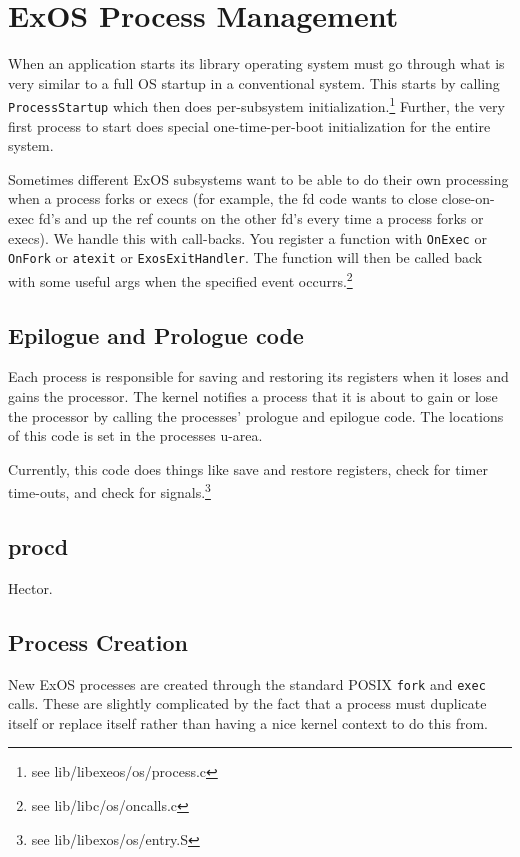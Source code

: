 \section {ExOS Process Management}

When an application starts its library operating system must go
through what is very similar to a full OS startup in a conventional
system. This starts by calling {\tt ProcessStartup} which then does
per-subsystem initialization.\footnote{see lib/libexeos/os/process.c}
Further, the very first process to start does special
one-time-per-boot initialization for the entire system.

Sometimes different ExOS subsystems want to be able to do their own
processing when a process forks or execs (for example, the fd code
wants to close close-on-exec fd's and up the ref counts on the other
fd's every time a process forks or execs). We handle this with
call-backs. You register a function with {\tt OnExec} or {\tt OnFork}
or {\tt atexit} or {\tt ExosExitHandler}. The function will then be
called back with some useful args when the specified event
occurrs.\footnote {see lib/libc/os/oncalls.c}

\subsection{Epilogue and Prologue code}

Each process is responsible for saving and restoring its registers
when it loses and gains the processor. The kernel notifies a process
that it is about to gain or lose the processor by calling the
processes' prologue and epilogue code. The locations of this code is
set in the processes u-area.

Currently, this code does things like save and restore registers,
check for timer time-outs, and check for signals.\footnote{see 
lib/libexos/os/entry.S}

\subsection {procd}

Hector.

\subsection {Process Creation}

New ExOS processes are created through the standard POSIX {\tt fork}
and {\tt exec} calls. These are slightly complicated by the fact that
a process must duplicate itself or replace itself rather than having a
nice kernel context to do this from.


